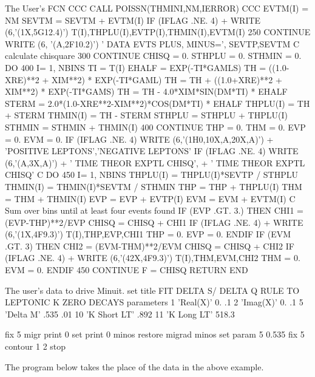 \begin{XMPt}{The User's FCN}
CCC      CALL POISSN(THMINI,NM,IERROR)
CCC      EVTM(I) = NM
      SEVTM = SEVTM + EVTM(I)
      IF (IFLAG .NE. 4)
     + WRITE (6,'(1X,5G12.4)') T(I),THPLU(I),EVTP(I),THMIN(I),EVTM(I)
  250 CONTINUE
      WRITE (6, '(A,2F10.2)') ' DATA EVTS PLUS, MINUS=', SEVTP,SEVTM
C                      calculate chisquare
  300 CONTINUE
      CHISQ = 0.
      STHPLU = 0.
      STHMIN = 0.
      DO 400 I= 1, NBINS
      TI = T(I)
      EHALF = EXP(-TI*GAMLS)
      TH =      ((1.0-XRE)**2 + XIM**2) * EXP(-TI*GAML)
      TH = TH + ((1.0+XRE)**2 + XIM**2) * EXP(-TI*GAMS)
      TH = TH -               4.0*XIM*SIN(DM*TI) * EHALF
      STERM = 2.0*(1.0-XRE**2-XIM**2)*COS(DM*TI) * EHALF
      THPLU(I) = TH + STERM
      THMIN(I) = TH - STERM
      STHPLU = STHPLU + THPLU(I)
      STHMIN = STHMIN + THMIN(I)
  400 CONTINUE
      THP = 0.
      THM = 0.
      EVP = 0.
      EVM = 0.
      IF (IFLAG .NE. 4) WRITE (6,'(1H0,10X,A,20X,A)')
     +  'POSITIVE LEPTONS','NEGATIVE LEPTONS'
      IF (IFLAG .NE. 4) WRITE (6,'(A,3X,A)')
     +    '      TIME    THEOR    EXPTL    CHISQ',
     +    '      TIME    THEOR    EXPTL    CHISQ'
C
      DO 450 I= 1, NBINS
      THPLU(I) = THPLU(I)*SEVTP / STHPLU
      THMIN(I) = THMIN(I)*SEVTM / STHMIN
      THP = THP + THPLU(I)
      THM = THM + THMIN(I)
      EVP = EVP + EVTP(I)
      EVM = EVM + EVTM(I)
C  Sum over bins until at least four events found
      IF (EVP .GT. 3.)  THEN
         CHI1 = (EVP-THP)**2/EVP
         CHISQ = CHISQ + CHI1
         IF (IFLAG .NE. 4)
     +      WRITE (6,'(1X,4F9.3)') T(I),THP,EVP,CHI1
         THP = 0.
         EVP = 0.
      ENDIF
      IF (EVM .GT. 3)  THEN
         CHI2 = (EVM-THM)**2/EVM
         CHISQ = CHISQ + CHI2
         IF (IFLAG .NE. 4)
     +      WRITE (6,'(42X,4F9.3)') T(I),THM,EVM,CHI2
         THM = 0.
         EVM = 0.
      ENDIF
  450 CONTINUE
      F = CHISQ
      RETURN
      END
\end{XMPt}

\begin{XMPt}{The user's data to drive Minuit.}
set title
FIT DELTA S/ DELTA Q RULE TO LEPTONIC K ZERO DECAYS
parameters
1 'Real(X)' 0. .1
2 'Imag(X)' 0. .1
5 'Delta M'  .535 .01
10 'K Short LT' .892
11 'K Long LT'   518.3
 
fix 5
migr
print 0
set print 0
minos
restore
migrad
minos
set param 5 0.535
fix 5
contour 1 2
stop
\end{XMPt}


The program below takes the place of
the data in the above example.

